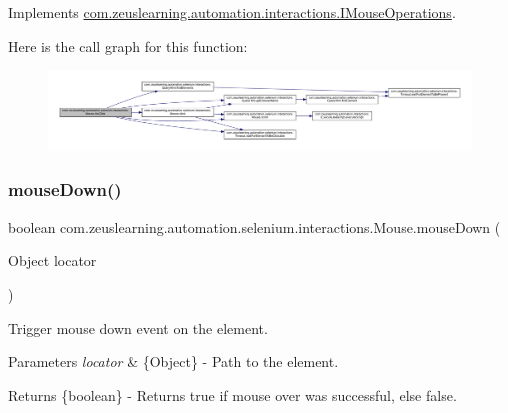 Implements \hyperlink{interfacecom_1_1zeuslearning_1_1automation_1_1interactions_1_1IMouseOperations_a77d60ff998cd36e27cb131a0c54f1690}{com.\+zeuslearning.\+automation.\+interactions.\+I\+Mouse\+Operations}.

Here is the call graph for this function\+:
\nopagebreak
\begin{figure}[H]
\begin{center}
\leavevmode
\includegraphics[width=350pt]{d0/dfa/classcom_1_1zeuslearning_1_1automation_1_1selenium_1_1interactions_1_1Mouse_ae7d7e20e0aa4c531d441da986d4fa3f0_cgraph}
\end{center}
\end{figure}
\hypertarget{classcom_1_1zeuslearning_1_1automation_1_1selenium_1_1interactions_1_1Mouse_a208023bff8f5799e5e61dfaa190d5feb}{}\label{classcom_1_1zeuslearning_1_1automation_1_1selenium_1_1interactions_1_1Mouse_a208023bff8f5799e5e61dfaa190d5feb} 
\subsubsection{\texorpdfstring{mouse\+Down()}{mouseDown()}\hspace{0.1cm}{\footnotesize\ttfamily [1/2]}}
{\footnotesize\ttfamily boolean com.\+zeuslearning.\+automation.\+selenium.\+interactions.\+Mouse.\+mouse\+Down (\begin{DoxyParamCaption}\item[{Object}]{locator }\end{DoxyParamCaption})\hspace{0.3cm}{\ttfamily [inline]}}

Trigger mouse down event on the element.


\begin{DoxyParams}{Parameters}
{\em locator} & \{Object\} -\/ Path to the element. \\
\hline
\end{DoxyParams}
\begin{DoxyReturn}{Returns}
\{boolean\} -\/ Returns {\ttfamily true} if mouse over was successful, else {\ttfamily false}. 
\end{DoxyReturn}


